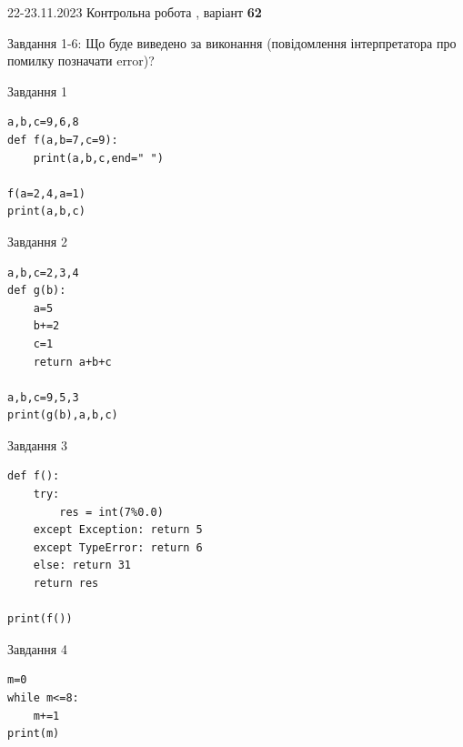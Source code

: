 \documentclass[12pt, ukrainian]{article}
\begin{document}
{{22-23.11.2023 Контрольна робота , варіант  \No \textbf { 62 }\par}}
{

Завдання 1-6: Що буде виведено за виконання (повідомлення інтерпретатора про помилку позначати error)?


\begin{minipage}[t]{9.7cm}                
{\begin{center}Завдання {1}\end{center}}
\begin{verbatim}
a,b,c=9,6,8
def f(a,b=7,c=9):
    print(a,b,c,end=" ")

f(a=2,4,a=1)
print(a,b,c)
\end{verbatim}     
\end{minipage}
\vline \hspace{8mm}
\begin{minipage}[t]{8.0cm}                
{\begin{center}Завдання {2}\end{center}}
\begin{verbatim}
a,b,c=2,3,4
def g(b):
    a=5
    b+=2
    c=1
    return a+b+c

a,b,c=9,5,3
print(g(b),a,b,c)
\end{verbatim}     
\end{minipage}

\vspace{15mm}
\begin{minipage}[t]{9.7cm}                
{\begin{center}Завдання {3}\end{center}}
\begin{verbatim}
def f():
    try:
        res = int(7%0.0)
    except Exception: return 5
    except TypeError: return 6
    else: return 31
    return res

print(f())
\end{verbatim}     
\end{minipage}
\vline \hspace{8mm}
\begin{minipage}[t]{8.0cm}                
{\begin{center}Завдання {4}\end{center}}
\begin{verbatim}
m=0
while m<=8:
    m+=1
print(m)
\end{verbatim}     
\end{minipage}

}
\end{document}

